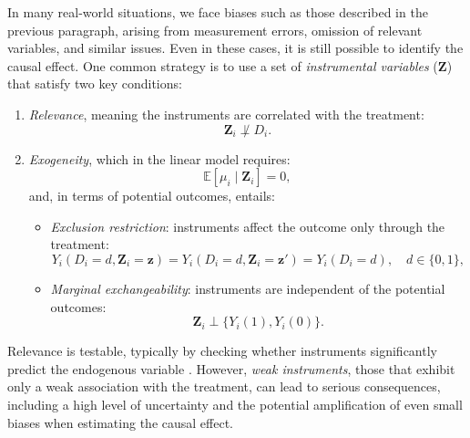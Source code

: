 In many real-world situations, we face biases such as those described in the previous paragraph, arising from measurement errors, omission of relevant variables, and similar issues. Even in these cases, it is still possible to identify the causal effect. One common strategy is to use a set of \textit{instrumental variables} ($\mathbf{Z}$) that satisfy two key conditions:
\begin{enumerate}
	\item \textit{Relevance}, meaning the instruments are correlated with the treatment:
	\[
	\mathbf{Z}_i \not\perp D_i.
	\]
	\item \textit{Exogeneity}, which in the linear model requires:
	\begin{equation}\label{eq:12_3}
		\mathbb{E}[\mu_i \mid \mathbf{Z}_i] = 0,
	\end{equation}
	and, in terms of potential outcomes, entails:
	\begin{itemize}
		\item \textit{Exclusion restriction}: instruments affect the outcome only through the treatment:
		\[
		Y_i(D_i = d, \mathbf{Z}_i = \mathbf{z}) = Y_i(D_i = d, \mathbf{Z}_i = \mathbf{z}') = Y_i(D_i = d), \quad d \in \{0,1\},
		\]
		\item \textit{Marginal exchangeability}: instruments are independent of the potential outcomes:
		\[
		\mathbf{Z}_i \perp \{ Y_i(1), Y_i(0) \}.
		\]
	\end{itemize}
\end{enumerate}

Relevance is testable, typically by checking whether instruments significantly predict the endogenous variable \cite{staiger1997instrumental,cragg1993testing,kleibergen2006generalized,stock2005asymptotic}. However, \textit{weak instruments}, those that exhibit only a weak association with the treatment, can lead to serious consequences, including a high level of uncertainty and the potential amplification of even small biases when estimating the causal effect.

